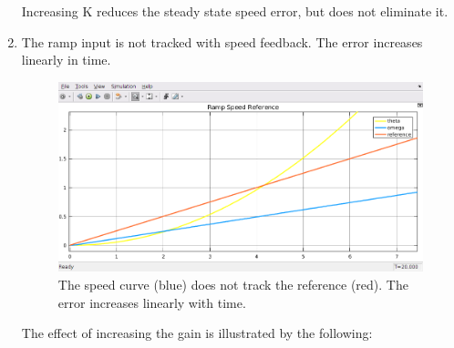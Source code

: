 \documentclass[11pt,a4paper]{article}
\begin{document}
\begin{enumerate}
Increasing K reduces the steady state speed error, but does not eliminate it.
	
	\item The ramp input is not tracked with speed feedback. The error increases linearly in time.
	
	\begin{figure}[h!]
	\includegraphics[width=\textwidth]{imglab/lab4sol_rampspeedtraj.png}
	\caption{The speed curve (blue) does not track the reference (red). The error increases linearly with time.}
	\end{figure}	
	
	The effect of increasing the gain is illustrated by the following:
	

\end{enumerate}
\end{document}
